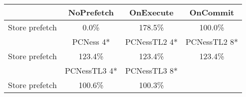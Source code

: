 \begin{tabular}{ l|ccc }
 & NoPrefetch & OnExecute & OnCommit\\ \hline
Store prefetch & 0.0\% & 178.5\% & 100.0\%\\ \hline
\hline
 & PCNess 4* & PCNessTL2 4* & PCNessTL2 8*\\ \hline
Store prefetch & 123.4\% & 123.4\% & 123.4\%\\ \hline
\hline
 & PCNessTL3 4* & PCNessTL3 8*&\\ \hline
Store prefetch & 100.6\% & 100.3\%&\\ \hline
\end{tabular}

